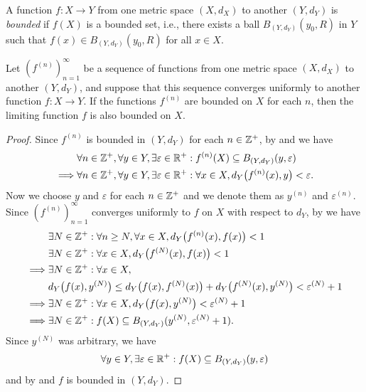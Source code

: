 \begin{defn}\label{ii:3.3.5}
  A function \(f : X \to Y\) from one metric space \((X, d_X)\) to another \((Y, d_Y)\) is \emph{bounded} if \(f(X)\) is a bounded set, i.e., there exists a ball \(B_{(Y, d_Y)}(y_0, R)\) in \(Y\) such that \(f(x) \in B_{(Y, d_Y)}(y_0, R)\) for all \(x \in X\).
\end{defn}

\begin{prop}\label{ii:3.3.6}
  Let \((f^{(n)})_{n = 1}^\infty\) be a sequence of functions from one metric space \((X, d_X)\) to another \((Y, d_Y)\), and suppose that this sequence converges uniformly to another function \(f : X \to Y\).
  If the functions \(f^{(n)}\) are bounded on \(X\) for each \(n\), then the limiting function \(f\) is also bounded on \(X\).
\end{prop}

\begin{proof}
  Since \(f^{(n)}\) is bounded in \((Y, d_Y)\) for each \(n \in \mathbb{Z}^+\), by  and  we have
  \begin{align*}
             & \forall n \in \mathbb{Z}^+, \forall y \in Y, \exists \varepsilon \in \mathbb{R}^+ : f^{(n)}(X) \subseteq B_{(Y, d_Y)}(y, \varepsilon)          \\
    \implies & \forall n \in \mathbb{Z}^+, \forall y \in Y, \exists \varepsilon \in \mathbb{R}^+ : \forall x \in X, d_Y\big(f^{(n)}(x), y\big) < \varepsilon.
  \end{align*}
  Now we choose \(y\) and \(\varepsilon\) for each \(n \in \mathbb{Z}^+\) and we denote them as \(y^{(n)}\) and \(\varepsilon^{(n)}\).
  Since \((f^{(n)})_{n = 1}^\infty\) converges uniformly to \(f\) on \(X\) with respect to \(d_Y\), by  we have
  \begin{align*}
             & \exists N \in \mathbb{Z}^+ : \forall n \geq N, \forall x \in X, d_Y\big(f^{(n)}(x), f(x)\big) < 1                                \\
             & \exists N \in \mathbb{Z}^+ : \forall x \in X, d_Y\big(f^{(N)}(x), f(x)\big) < 1                                                  \\
    \implies & \exists N \in \mathbb{Z}^+ : \forall x \in X,                                                                                    \\
             & d_Y\big(f(x), y^{(N)}\big) \leq d_Y\big(f(x), f^{(N)}(x)\big) + d_Y\big(f^{(N)}(x), y^{(N)}\big) < \varepsilon^{(N)} + 1 \\
    \implies & \exists N \in \mathbb{Z}^+ : \forall x \in X, d_Y\big(f(x), y^{(N)}\big) < \varepsilon^{(N)} + 1                                 \\
    \implies & \exists N \in \mathbb{Z}^+ : f(X) \subseteq B_{(Y, d_Y)}(y^{(N)}, \varepsilon^{(N)} + 1).
  \end{align*}
  Since \(y^{(N)}\) was arbitrary, we have
  \[
    \forall y \in Y, \exists \varepsilon \in \mathbb{R}^+ : f(X) \subseteq B_{(Y, d_Y)}(y, \varepsilon)
  \]
  and by  and  \(f\) is bounded in \((Y, d_Y)\).
\end{proof}

